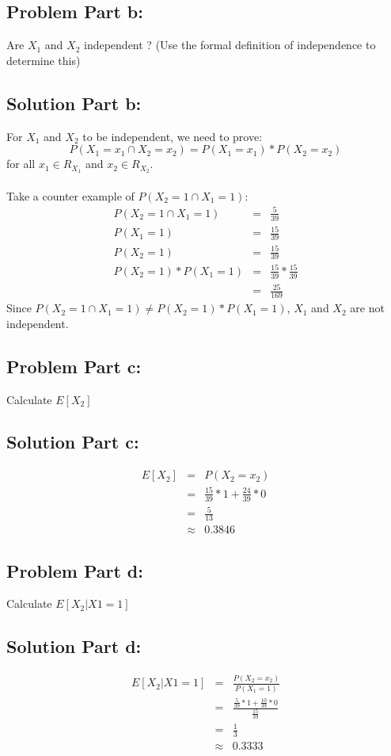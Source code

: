 \documentclass[12pt]{article}%
\begin{document}
\subsection*{Problem Part b:}
Are $X_1$ and $X_2$ independent ? (Use the formal definition of independence to determine this)
\subsection*{Solution Part b:}
For $X_1$ and $X_2$ to be independent, we need to prove: \begin{equation*}
P(X_1=x_1 \cap X_2=x_2) = P(X_1=x_1) * P(X_2=x_2)
\end{equation*}
for all $x_1 \in R_{X_1}$ and $x_2 \in R_{X_2}$. \\ \\
Take a counter example of $P(X_2=1 \cap X_1=1)$:
\begin{eqnarray*}
P(X_2=1 \cap X_1=1) & = & \frac{5}{39} \\
P(X_1=1) & = & \frac{15}{39} \\
P(X_2=1) & = & \frac{15}{39} \\
P(X_2=1)*P(X_1=1) & = & \frac{15}{39} * \frac{15}{39} \\
				  & = & \frac{25}{169} 
\end{eqnarray*}
Since $P(X_2=1 \cap X_1=1) \neq P(X_2=1)*P(X_1=1)$, $X_1$ and $X_2$ are not independent. 
\subsection*{Problem Part c:}
Calculate $E[X_2]$
\subsection*{Solution Part c:}
\begin{eqnarray*}
E[X_2] & = & P(X_2 = x_2) \\
	   & = & \frac{15}{39} * 1 + \frac{24}{39} * 0 \\
	   & = & \frac{5}{13} \\
	   & \approx & 0.3846
\end{eqnarray*}
\subsection*{Problem Part d:}
Calculate $E[X_2|X1 = 1]$
\subsection*{Solution Part d:}
\begin{eqnarray*}
E[X_2|X1 = 1] & = & \frac{P(X_2 = x_2)}{P(X_1=1)} \\
	   & = & \frac{\frac{5}{39}*1+\frac{10}{39}*0}{\frac{15}{39}} \\
	   & = & \frac{1}{3} \\
	   & \approx & 0.3333
\end{eqnarray*}
\end{document}
